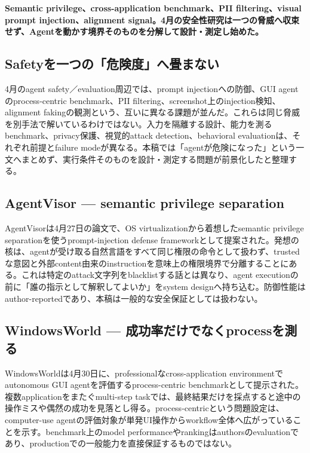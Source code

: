 \noindent\textbf{Semantic privilege、cross-application benchmark、PII filtering、visual prompt injection、alignment signal。4月の安全性研究は一つの脅威へ収束せず、Agentを動かす境界そのものを分解して設計・測定し始めた。}\autocite{src-2f8952da2dc3,src-3efc4342b784,src-477d406be59c,src-73ae4b975e7b,src-8cf1b0dc8361,src-a408165af133}

\subsection{Safetyを一つの「危険度」へ畳まない}

4月のagent safety／evaluation周辺では、prompt injectionへの防御、GUI agentのprocess-centric benchmark、PII filtering、screenshot上のinjection検知、alignment fakingの観測という、互いに異なる課題が並んだ。これらは同じ脅威を別手法で解いているわけではない。入力を隔離する設計、能力を測るbenchmark、privacy保護、視覚的attack detection、behavioral evaluationは、それぞれ前提とfailure modeが異なる。本稿では「agentが危険になった」という一文へまとめず、実行条件そのものを設計・測定する問題が前景化したと整理する。\autocite{src-2f8952da2dc3,src-3efc4342b784,src-477d406be59c,src-73ae4b975e7b,src-8cf1b0dc8361,src-a408165af133}


\subsection{AgentVisor — semantic privilege separation}

AgentVisorは4月27日の論文で、OS virtualizationから着想したsemantic privilege separationを使うprompt-injection defense frameworkとして提案された。発想の核は、agentが受け取る自然言語をすべて同じ権限の命令として扱わず、trustedな意図と外部content由来のinstructionを意味上の権限境界で分離することにある。これは特定のattack文字列をblacklistする話とは異なり、agent executionの前に「誰の指示として解釈してよいか」をsystem designへ持ち込む。防御性能はauthor-reportedであり、本稿は一般的な安全保証としては扱わない。\autocite{src-8cf1b0dc8361}


\subsection{WindowsWorld — 成功率だけでなくprocessを測る}

WindowsWorldは4月30日に、professionalなcross-application environmentでautonomous GUI agentを評価するprocess-centric benchmarkとして提示された。複数applicationをまたぐmulti-step taskでは、最終結果だけを採点すると途中の操作ミスや偶然の成功を見落とし得る。process-centricという問題設定は、computer-use agentの評価対象が単発UI操作からworkflow全体へ広がっていることを示す。benchmark上のmodel performanceやrankingはauthorsのevaluationであり、productionでの一般能力を直接保証するものではない。\autocite{src-a408165af133}


